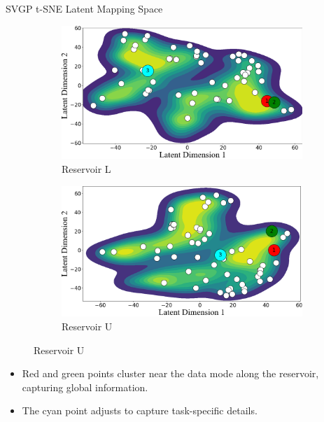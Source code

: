 \begin{frame}{SVGP t-SNE Latent Mapping Space}
\begin{figure}[htbp]
		\begin{subfigure}[t]{0.4\columnwidth}
			\centering
			\includegraphics[width=\columnwidth]{chp_sogp/figures/TSNE_task11_kde_p30.png}
			\caption{Reservoir L}
		\end{subfigure}
		\hspace{0.05\columnwidth} %
		\begin{subfigure}[t]{0.4\columnwidth}
			\centering
			\includegraphics[width=\columnwidth]{chp_sogp/figures/TSNE_task20_kde_p30.png}
			\caption{Reservoir U}
		\end{subfigure}
		
		\vspace{-1.5em} %
	\end{figure}
\begin{itemize}
	\item Red and green points cluster near the data mode along the reservoir, capturing global information.
	\item The cyan point adjusts to capture task-specific details.
\end{itemize}


\end{frame}


